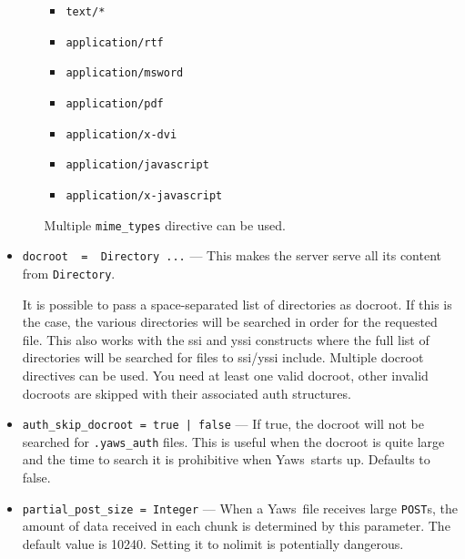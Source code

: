 \documentclass[11pt,oneside,english]{book}
\newcommand{\Yaws}            %
        {{\sc Yaws}}
\begin{document}
\begin{itemize}
\begin{itemize}
                    \begin{itemize}
                    \item \verb+text/*+
                    \item \verb+application/rtf+
                    \item \verb+application/msword+
                    \item \verb+application/pdf+
                    \item \verb+application/x-dvi+
                    \item \verb+application/javascript+
                    \item \verb+application/x-javascript+
                    \end{itemize}
                    Multiple \verb+mime_types+ directive can be used.
             \end{itemize}

\item       \verb+docroot  =  Directory ...+ ---
              This makes the server serve all its content from
              \verb+Directory+.

              It is possible to pass a space-separated list of directories as
              docroot. If this is the case, the various directories will be
              searched in order for the requested file. This also works with the
              ssi and yssi constructs where the full list of directories will be
              searched for files to ssi/yssi include. Multiple docroot
              directives can be used.  You need at least one valid docroot,
              other invalid docroots are skipped with their associated auth
              structures.

\item       \verb+auth_skip_docroot = true | false+ ---
              If true, the docroot will not be searched for
              \verb+.yaws_auth+ files. This is useful when the
              docroot is quite large and the time to search it is
              prohibitive when \Yaws\  starts up. Defaults to false.

\item       \verb+partial_post_size = Integer+ ---
              When a \Yaws\ file receives large \verb+POST+s, the amount of
              data received in each chunk is determined by this parameter.
              The default value is 10240. Setting it to nolimit is
              potentially dangerous.


\end{itemize}
\end{document}
